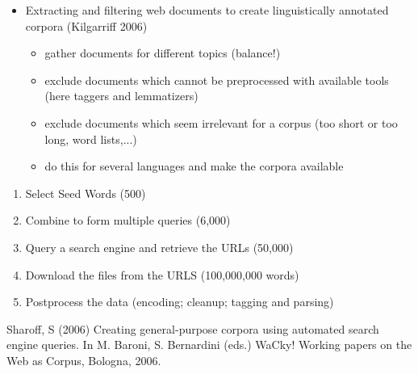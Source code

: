 \documentclass[a4paper,landscape,headrule,footrule,xetex]{foils}
\begin{document}
\MyLogo{}
\begin{itemize}
\item Extracting and filtering web documents to create linguistically
  annotated corpora (Kilgarriff 2006)
  \begin{itemize}
  \item gather documents for different topics (balance!)
  \item exclude documents which cannot be preprocessed with available
    tools (here taggers and lemmatizers)
  \item exclude documents which seem irrelevant for a corpus (too short or
    too long, word lists,...)
  \item do this for several languages and make the corpora available
  \end{itemize}
\end{itemize}



\begin{enumerate}
\item Select Seed Words (500)
\item Combine to form multiple queries (6,000)
\item Query a search engine and retrieve the URLs (50,000)
\item Download the files from the URLS (100,000,000 words)
\item Postprocess the data (encoding; cleanup; tagging and parsing)
\end{enumerate}

Sharoff, S (2006) Creating general-purpose corpora using automated search engine queries. In M. Baroni, S. Bernardini (eds.) WaCky! Working papers on the Web as Corpus, Bologna, 2006.

\MyLogo{}
 
\end{document}
